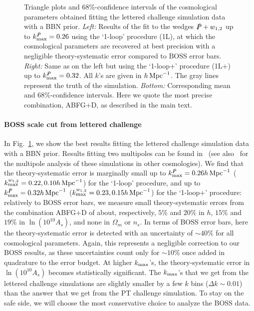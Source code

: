 \documentclass[12pt,a4paper]{article}
\def\hinvMpc{h\,{\rm Mpc}^{-1}}
\def\PA{\slashed{P}}
\renewcommand{\(}{\left(}
\renewcommand{\)}{\right)}
\begin{document}
{\begin{figure}[ht!]
\caption{\small Triangle plots and $68\%$-confidence intervals of the cosmological parameters obtained fitting the lettered challenge simulation data with a BBN prior. 
{\it Left:} Results of the fit to the wedges $\PA + w_{1,2}$ up to $k_{\rm max}^{\PA} = 0.26$ using the `1-loop' procedure (1L), at which the cosmological parameters are recovered at best precision with a negligible theory-systematic error compared to BOSS error bars. 
{\it Right:} Same as on the left but using the `1-loop+' procedure (1L+) up to $k_{\rm max}^{\PA} = 0.32$. 
All $k$'s are given in $\hinvMpc$. 
The gray lines represent the truth of the simulation. 
{\it Bottom: } Corresponding mean and $68\%$-confidence intervals. Here we quote the most precise combination, ABFG+D, as described in the main text. 
} \label{fig:letter} 
\end{figure}

\paragraph{BOSS scale cut from lettered challenge} In Fig.~\ref{fig:letter}, we show the best results fitting the lettered challenge simulation data with a BBN prior. 
Results fitting two multipoles can be found in~\cite{Colas:2019ret} (see also~\cite{DAmico:2020kxu,DAmico:2020tty} for the multipole analysis of these simulations in other cosmologies). 
We find that the theory-systematic error is marginally small up to $k_{\rm max}^{\PA} = 0.26 \hinvMpc$ ($k_{\rm max}^{w_{1,2}} = 0.22, 0.10 \hinvMpc$) for the `1-loop' procedure, and up to $k_{\rm max}^{\PA} = 0.32 \hinvMpc$ ($k_{\rm max}^{w_{1,2}} = 0.23, 0.15 \hinvMpc$) for the `1-loop+' procedure: relatively to BOSS error bars, we measure small theory-systematic errors from the combination ABFG+D of about, respectively, $5\%$ and $20\%$ in $h$, $15\%$ and $19\%$ in $\ln (10^{10} A_s)$, and none in $\Omega_m$ or $n_s$. 
In terms of BOSS error bars, here the theory-systematic error is detected with an uncertainty of $\sim 40\%$ for all cosmological parameters. 
Again, this represents a negligible correction to our BOSS results, as these uncertainties count only for $\sim 10\%$ once added in quadrature to the error budget. 
At higher $k_{\rm max}$'s, the theory-systematic error in $\ln (10^{10} A_s)$ becomes statistically significant. 
The $k_{\rm max}$'s that we get from the lettered challenge simulations are slightly {smaller} by a few $k$ bins ($\Delta k \sim 0.01$) than the answer that we get from the PT challenge simulation. 
To stay on the safe side, we will choose the most conservative choice to analyze the BOSS data. 

}
\end{document}
